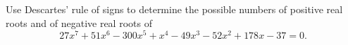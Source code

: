 Use Descartes' rule of signs to determine the possible numbers of positive real roots and of negative real roots of
\[
27x^7+51x^6-300x^5+x^4-49x^3-52x^2+178x-37=0 .
\]
